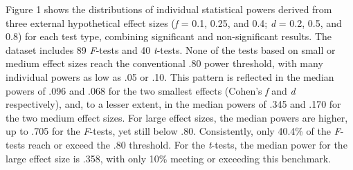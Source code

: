 \documentclass[authordate, meta]{jote-new-article}
\begin{document}
	Figure 1 shows the distributions of individual statistical powers derived from three external hypothetical effect sizes (\emph{f} = 0.1, 0.25, and 0.4; \emph{d} = 0.2, 0.5, and 0.8) for each test type, combining significant and non-significant results. The dataset includes 89 \emph{F}-tests and 40 \emph{t}-tests. None of the tests based on small or medium effect sizes reach the conventional .80 power threshold, with many individual powers as low as .05 or .10. This pattern is reflected in the median powers of .096 and .068 for the two smallest effects (Cohen's \emph{f} and \emph{d} respectively), and, to a lesser extent, in the median powers of .345 and .170 for the two medium effect sizes. For large effect sizes, the median powers are higher, up to .705 for the \emph{F}-tests, yet still below .80. Consistently, only 40.4\% of the \emph{F}-tests reach or exceed the .80 threshold. For the \emph{t}-tests, the median power for the large effect size is .358, with only 10\% meeting or exceeding this benchmark.
\end{document}
